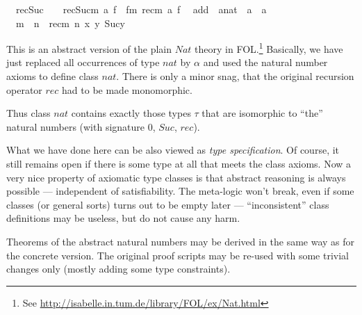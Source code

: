 \begin{isabellebody}
\ \ rec{\isacharunderscore}Suc{\isacharcolon}\ \ \ \ {\isachardoublequote}rec{\isacharparenleft}Suc{\isacharparenleft}m{\isacharparenright}{\isacharcomma}\ a{\isacharcomma}\ f{\isacharparenright}\ {\isacharequal}\ f{\isacharparenleft}m{\isacharcomma}\ rec{\isacharparenleft}m{\isacharcomma}\ a{\isacharcomma}\ f{\isacharparenright}{\isacharparenright}{\isachardoublequote}\isanewline
\isanewline
{}\isanewline
\ \ add\ {\isacharcolon}{\isacharcolon}\ {\isachardoublequote}{\isacharprime}a{\isacharcolon}{\isacharcolon}nat\ {\isasymRightarrow}\ {\isacharprime}a\ {\isasymRightarrow}\ {\isacharprime}a{\isachardoublequote}\ \ \ \ {\isacharparenleft}\ {\isachardoublequote}{\isacharplus}{\isachardoublequote}\ \isanewline
\ \ {\isachardoublequote}m\ {\isacharplus}\ n\ {\isasymequiv}\ rec{\isacharparenleft}m{\isacharcomma}\ n{\isacharcomma}\ {\isasymlambda}x\ y{\isachardot}\ Suc{\isacharparenleft}y{\isacharparenright}{\isacharparenright}{\isachardoublequote}%
\begin{isamarkuptext}%
This is an abstract version of the plain $Nat$ theory in
 FOL.\footnote{See
 \url{http://isabelle.in.tum.de/library/FOL/ex/Nat.html}} Basically,
 we have just replaced all occurrences of type $nat$ by $\alpha$ and
 used the natural number axioms to define class $nat$.  There is only
 a minor snag, that the original recursion operator $rec$ had to be
 made monomorphic.

 Thus class $nat$ contains exactly those types $\tau$ that are
 isomorphic to ``the'' natural numbers (with signature $0$, $Suc$,
 $rec$).

 \medskip What we have done here can be also viewed as \emph{type
 specification}.  Of course, it still remains open if there is some
 type at all that meets the class axioms.  Now a very nice property of
 axiomatic type classes is that abstract reasoning is always possible
 --- independent of satisfiability.  The meta-logic won't break, even
 if some classes (or general sorts) turns out to be empty later ---
 ``inconsistent'' class definitions may be useless, but do not cause
 any harm.

 Theorems of the abstract natural numbers may be derived in the same
 way as for the concrete version.  The original proof scripts may be
 re-used with some trivial changes only (mostly adding some type
 constraints).%
\end{isamarkuptext}%
\end{isabellebody}%

